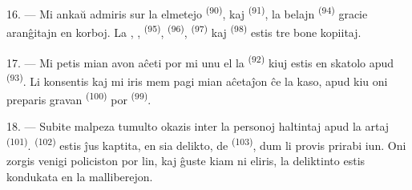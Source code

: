 16. --- Mi ankaŭ admiris sur la elmetejo 
\textsuperscript{(90)}, kaj  \textsuperscript{(91)}, la belajn
 \textsuperscript{(94)} gracie aranĝitajn en
korboj. La , , 
\textsuperscript{(95)},  \textsuperscript{(96)},
 \textsuperscript{(97)} kaj 
\textsuperscript{(98)} estis tre bone kopiitaj.

\VUsaut{4.4mm}
\VUsaut{2.8mm}

17. --- Mi petis mian avon aĉeti por mi unu el la 
\textsuperscript{(92)} kiuj estis en skatolo apud 
\textsuperscript{(93)}. Li konsentis kaj mi iris mem pagi mian aĉetaĵon ĉe la
kaso, apud kiu oni preparis gravan  \textsuperscript{(100)}
por  \textsuperscript{(99)}.

18. --- Subite malpeza tumulto okazis inter la personoj haltintaj apud la artaj
 \textsuperscript{(101)}. 
\textsuperscript{(102)} estis ĵus kaptita, en sia delikto, de 
\textsuperscript{(103)}, dum li provis prirabi iun. Oni zorgis venigi policiston
por  lin, kaj ĝuste kiam ni eliris, la deliktinto estis
kondukata en la malliberejon.
\VUsaut{6.0mm}
\VUfilet{22mm}
